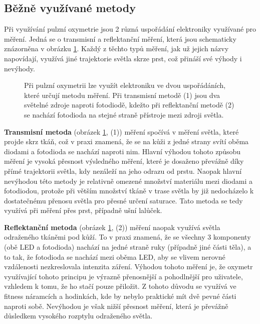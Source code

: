 \subsection {Běžně využívané metody}
Při využívání pulzní oxymetrie jsou 2 různá uspořádání elektroniky využívané pro měření. Jedná se o transmisní a reflektanční měření, která jsou schematicky znázorněna v obrázku \ref{fig:Metody}. Každý z těchto typů měření, jak už jejich názvy napovídají, využívá jiné trajektorie světla skrze prst, což přináší své výhody i nevýhody.
\begin{figure}[H]
    \def\svgwidth{\columnwidth}
    
    \caption [Transmisní a reflektanční metoda]{Při pulzní oxymetrii lze využít elektroniku ve dvou uspořádáních, které určují metodu měření. Při transmisní metodě (1) jsou dva světelné zdroje naproti fotodiodě, kdežto při reflektanční metodě (2) se nachází fotodioda na stejné straně přístroje mezi zdroji světla.}
    \label{fig:Metody}
\end{figure}
\par \textbf{Transmisní metoda} (obrázek \ref{fig:Metody}, (1)) měření spočívá v měření světla, které projde skrz tkáň, což v praxi znamená, že se na kůži z jedné strany svítí oběma diodami a fotodioda se nachází naproti nim. Hlavní výhodou tohoto způsobu měření je vysoká přesnost výsledného měření, které je dosaženo převážně díky přímé trajektorii světla, kdy nezáleží na jeho odrazu od prstu. Naopak hlavní nevýhodou této metody je relativně omezené množství materiálu mezi diodami a fotodiodou, protože při větším množství tkáně v trase světla by již nedocházelo k dostatečnému přenosu světla pro přesné určení saturace. Tato metoda se tedy využívá při měření přes prst, případně ušní lalůček.
\par \textbf{Reflektanční metoda} (obrázek \ref{fig:Metody}, (2)) měření naopak využívá světla odraženého tkáněmi pod kůží. To v praxi znamená, že se všechny 3 komponenty (obě LED a fotodioda) nachází na jedné straně ruky (případně jiné části těla), a to tak, že fotodioda se nachází mezi oběma LED, aby se vlivem nerovné vzdálenosti nezkreslovala intenzita záření. Výhodou tohoto měření je, že oxymetr využívající tohoto principu je výrazně přenosnější a pohodlnější pro uživatele, vzhledem k tomu, že ho stačí pouze přiložit. Z tohoto důvodu se využívá ve fitness náramcích a hodinkách, kde by nebylo praktické mít dvě pevné části naproti sobě. Nevýhodou je však nižší přesnost měření, která je převážně důsledkem vysokého rozptylu odraženého světla.